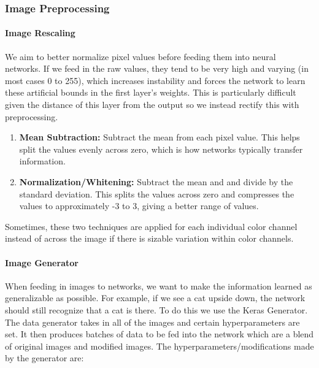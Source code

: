 \subsubsection{Image Preprocessing}\label{s:imgpr}

\paragraph{Image Rescaling}
We aim to better normalize pixel values before feeding them into neural networks. If we feed in the raw values, they tend to be very high and varying (in most cases 0 to 255), which increases instability and forces the network to learn these artificial bounds in the first layer's weights. This is particularly difficult given the distance of this layer from the output so we instead rectify this with preprocessing.

\begin{enumerate}
	\item \textbf{Mean Subtraction:} Subtract the mean from each pixel value. This helps split the values evenly across zero, which is how networks typically transfer information.
	\item \textbf{Normalization/Whitening:} Subtract the mean and and divide by the standard deviation. This splits the values across zero and compresses the values to approximately -3 to 3, giving a better range of values.
\end{enumerate}

Sometimes, these two techniques are applied for each individual color channel instead of across the image if there is sizable variation within color channels.

\paragraph{Image Generator}\label{s:img-gen}
When feeding in images to networks, we want to make the information learned as generalizable as possible. For example, if we see a cat upside down, the network should still recognize that a cat is there. To do this we use the Keras Generator. The data generator takes in all of the images and certain hyperparameters are set. It then produces batches of data to be fed into the network which are a blend of original images and modified images. The hyperparameters/modifications made by the generator are:

